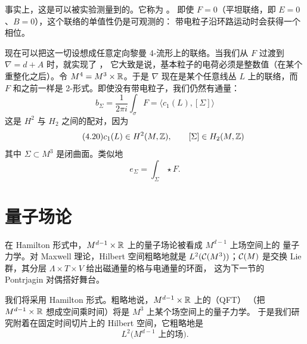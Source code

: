 事实上，这是可以被实验测量到的。它称为 。
即使 $F=0$（平坦联络，即 $E=0$、$B=0$），这个联络的单值性仍是可观测的：
带电粒子沿环路运动时会获得一个相位。

现在可以把这一切设想成任意定向黎曼 4-流形上的联络。当我们从 $F$ 过渡到
$\nabla=d+A$ 时，就实现了 ，
它大致是说，基本粒子的电荷必须是整数值（在某个重整化之后）。令
$M^{4}=M^{3}\times\mathbb{R}$。于是 $\nabla$ 现在是某个任意线丛 $L$ 上的联络，而
$F$ 和之前一样是 2-形式。即使没有带电粒子，我们仍然有通量：
\begin{equation}\tag{4.19}
b_{\Sigma}=\frac{1}{2\pi i}\int_{\sigma}F=\langle c_{1}(L),[\Sigma]\rangle
\end{equation}
这是 $H^{2}$ 与 $H_{2}$ 之间的配对，因为
\begin{equation}\tag{4.20}
c_{1}(L)\in H^{2}(M,\mathbb{Z}),\qquad [\Sigma]\in H_{2}(M,\mathbb{Z})
\end{equation}
其中 $\Sigma\subset M^{3}$ 是闭曲面。类似地
\begin{equation}\tag{4.21}
e_{\Sigma}=\int_{\Sigma}\star F.
\end{equation}


\section{量子场论}
\begin{sectionkey}
在 Hamilton 形式中，$M^{d-1}\times\mathbb{R}$ 上的量子场论被看成 $M^{d-1}$ 上场空间上的
量子力学。对 Maxwell 理论，Hilbert 空间粗略地就是 $L^{2}(\mathcal{C}(M^{3}))$；$\mathcal{C}(M)$
是交换 Lie 群，其分层 $\Lambda\times T\times V$ 给出磁通量的格与电通量的环面，
这为下一节的 Pontrjagin 对偶搭好舞台。
\end{sectionkey}

我们将采用 Hamilton 形式。粗略地说，$M^{d-1}\times\mathbb{R}$ 上的（QFT）
（把 $M^{d-1}\times\mathbb{R}$ 想成空间乘时间）将是 $M^{3}$ 上某个场空间上的量子力学。
于是我们研究附着在固定时间切片上的 Hilbert 空间，它粗略地是
\begin{equation}\tag{4.22}
L^{2}\bigl(M^{d-1}\text{ 上的场}\bigr).
\end{equation}

